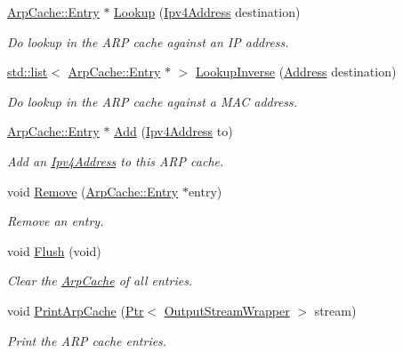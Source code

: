 \begin{DoxyCompactItemize}
\item 
\hyperlink{classns3_1_1ArpCache_1_1Entry}{Arp\+Cache\+::\+Entry} $\ast$ \hyperlink{classns3_1_1ArpCache_a9402dc061ed329656e75c0dd9d591c0b}{Lookup} (\hyperlink{classns3_1_1Ipv4Address}{Ipv4\+Address} destination)
\begin{DoxyCompactList}\small\item\em Do lookup in the A\+RP cache against an IP address. \end{DoxyCompactList}\item 
\hyperlink{openflow-interface_8h_afd9bcfa176617760671b67580f536fa7}{std\+::list}$<$ \hyperlink{classns3_1_1ArpCache_1_1Entry}{Arp\+Cache\+::\+Entry} $\ast$ $>$ \hyperlink{classns3_1_1ArpCache_a906f1f74032fec4ebe54792cb07f34cd}{Lookup\+Inverse} (\hyperlink{classns3_1_1Address}{Address} destination)
\begin{DoxyCompactList}\small\item\em Do lookup in the A\+RP cache against a M\+AC address. \end{DoxyCompactList}\item 
\hyperlink{classns3_1_1ArpCache_1_1Entry}{Arp\+Cache\+::\+Entry} $\ast$ \hyperlink{classns3_1_1ArpCache_a7fb6a10eb08b6fb3af0f7848a28a61b4}{Add} (\hyperlink{classns3_1_1Ipv4Address}{Ipv4\+Address} to)
\begin{DoxyCompactList}\small\item\em Add an \hyperlink{classns3_1_1Ipv4Address}{Ipv4\+Address} to this A\+RP cache. \end{DoxyCompactList}\item 
void \hyperlink{classns3_1_1ArpCache_a132f62e7c8b6be8674017df5591d872f}{Remove} (\hyperlink{classns3_1_1ArpCache_1_1Entry}{Arp\+Cache\+::\+Entry} $\ast$entry)
\begin{DoxyCompactList}\small\item\em Remove an entry. \end{DoxyCompactList}\item 
void \hyperlink{classns3_1_1ArpCache_a7feb098de790b3ed4383dd73a11d856c}{Flush} (void)
\begin{DoxyCompactList}\small\item\em Clear the \hyperlink{classns3_1_1ArpCache}{Arp\+Cache} of all entries. \end{DoxyCompactList}\item 
void \hyperlink{classns3_1_1ArpCache_a521e3f77a195864909066b493f32a3c9}{Print\+Arp\+Cache} (\hyperlink{classns3_1_1Ptr}{Ptr}$<$ \hyperlink{classns3_1_1OutputStreamWrapper}{Output\+Stream\+Wrapper} $>$ stream)
\begin{DoxyCompactList}\small\item\em Print the A\+RP cache entries. \end{DoxyCompactList}\end{DoxyCompactItemize}
